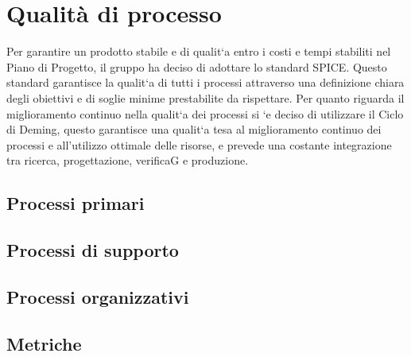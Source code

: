 \section{Qualità di processo}
Per garantire un prodotto stabile e di qualit`a entro i costi e tempi stabiliti
nel Piano di Progetto, il gruppo ha deciso di adottare lo standard SPICE.
Questo standard garantisce la qualit`a di tutti i processi attraverso una
definizione chiara degli obiettivi e di soglie minime prestabilite da
rispettare. Per quanto riguarda il miglioramento continuo nella qualit`a dei
processi si `e deciso di utilizzare il Ciclo di Deming, questo garantisce una
qualit`a tesa al miglioramento continuo dei processi e all'utilizzo ottimale
delle risorse, e prevede una costante integrazione tra ricerca, progettazione,
verificaG e produzione.
\subsection{Processi primari}

\subsection{Processi di supporto}
\subsection{Processi organizzativi}
\subsection{Metriche}